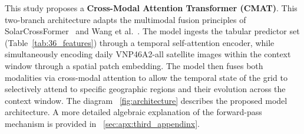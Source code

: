 This study proposes a \textbf{Cross-Modal Attention Transformer (CMAT)}. This two-branch architecture adapts the multimodal fusion principles of SolarCrossFormer~\cite{schubnel_solarcrossformer_2025} and Wang et al.~\cite{wang_causal-aware_2025}. The model ingests the tabular predictor set (Table~\ref{tab:36_features}) through a temporal self-attention encoder, while simultaneously encoding daily VNP46A2-all satellite images within the context window through a spatial patch embedding. The model then fuses both modalities via cross-modal attention to allow the temporal state of the grid to selectively attend to specific geographic regions and their evolution across the context window. The diagram ~\ref{fig:architecture} describes the proposed model architecture. A more detailed algebraic explanation of the forward-pass mechanism is provided in ~\ref{sec:apx:third_appendinx}.

